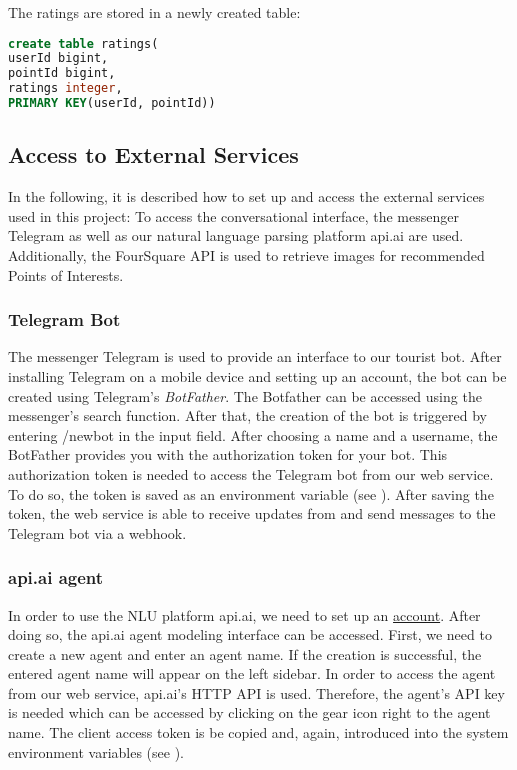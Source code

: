 The ratings are stored in a newly created table:
\begin{lstlisting}[language=sql]
create table ratings(
userId bigint,
pointId bigint,
ratings integer,
PRIMARY KEY(userId, pointId))
\end{lstlisting}

\subsection{Access to External Services}
In the following, it is described how to set up and access the external services used in this project:
To access the conversational interface, the messenger Telegram as well as our natural language parsing platform api.ai are used. Additionally, the FourSquare API is used to retrieve images for recommended Points of Interests.

\subsubsection{Telegram Bot}
 The messenger Telegram is used to provide an interface to our tourist bot. After installing Telegram on a mobile device and setting up an account, the bot can be created using Telegram’s \textit{BotFather}. The Botfather can be accessed using the messenger’s search function. After that, the creation of the bot is triggered by entering /newbot in the input field.
After choosing a name and a username, the BotFather provides you with the authorization token for your bot. This authorization token is needed to access the Telegram bot from our web service. To do so, the token is saved as an environment variable (see ). After saving the token, the web service is able to receive updates from and send messages to the Telegram bot via a webhook. 

\subsubsection{api.ai agent}
In order to use the NLU platform api.ai, we need to set up an \hyperlink{https://console.api.ai/api-client/}{account}. After doing so, the api.ai agent modeling interface can be accessed. First, we need to create a new agent and enter an agent name. 
If the creation is successful, the entered agent name will appear on the left sidebar. In order to access the agent from our web service, api.ai’s HTTP API is used. Therefore, the agent’s API key is needed which can be accessed by clicking on the gear icon right to the agent name. The client access token is be copied and, again, introduced into the system environment variables (see ).

